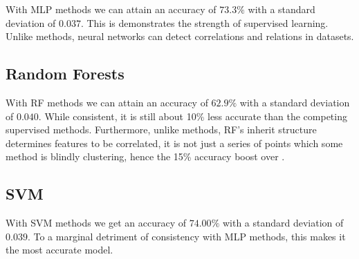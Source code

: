 
With MLP methods we can attain an accuracy of $73.3\%$ with a standard deviation of $0.037$. This is demonstrates the strength of supervised learning. Unlike \knn methods, neural networks can detect correlations and relations in datasets.

\subsection{Random Forests}


With RF methods we can attain an accuracy of $62.9\%$ with a standard deviation of $0.040$. While consistent, it is still about 10\% less accurate than the competing supervised methods. Furthermore, unlike \knn methods, RF's inherit structure determines features to be correlated, it is not just a series of points which some method is blindly clustering, hence the 15\% accuracy boost over \knn.

\subsection{SVM}


With SVM methods we get an accuracy of $74.00\%$ with a standard deviation of $0.039$. To a marginal detriment of consistency with MLP methods, this makes it the most accurate model.